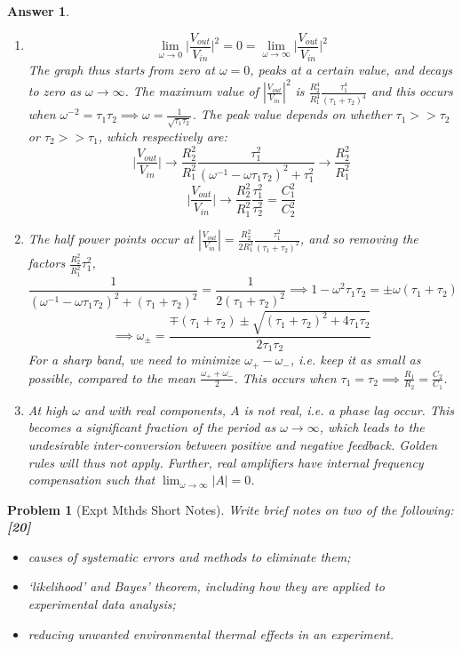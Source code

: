\documentclass[a4paper]{article}
\newtheorem{ans}{Answer}[subsection]
\theoremstyle{new}
\newtheorem{qns}{Problem}[subsection]
\begin{document}
\begin{ans}
\begin{enumerate}[label=(\roman*)]
\item 
$$\lim_{\omega\rightarrow 0}\bigg|\frac{V_{out}}{V_{in}}\bigg|^2=0=\lim_{\omega\rightarrow\infty}\bigg|\frac{V_{out}}{V_{in}}\bigg|^2$$
The graph thus starts from zero at $\omega=0$, peaks at a certain value, and decays to zero as $\omega\rightarrow\infty$. The maximum value of $|\frac{V_{out}}{V_{in}}|^2$ is $\frac{R_2^4}{R_1^4}\frac{\tau_1^4}{(\tau_1+\tau_2)^4}$ and this occurs when $\omega^{-2}=\tau_1\tau_2\implies\omega=\frac{1}{\sqrt{\tau_1\tau_2}}$. The peak value depends on whether $\tau_1>>\tau_2$ or $\tau_2>>\tau_1$, which respectively are: 
$$\bigg|\frac{V_{out}}{V_{in}}\bigg|\rightarrow\frac{R_2^2}{R_1^2}\frac{\tau_1^2}{(\omega^{-1}-\omega\tau_1\tau_2)^2+\tau_1^2}\rightarrow\frac{R_2^2}{R_1^2}$$
$$\bigg|\frac{V_{out}}{V_{in}}\bigg|\rightarrow\frac{R_2^2}{R_1^2}\frac{\tau_1^2}{\tau_2^2}=\frac{C_1^2}{C_2^2}$$
\item The half power points occur at $|\frac{V_{out}}{V_{in}}|=\frac{R_2^2}{2R_1^2}\frac{\tau_1^2}{(\tau_1+\tau_2)^2}$, and so removing the factors $\frac{R_2^2}{R_1^2}\tau_1^2$,
$$\frac{1}{(\omega^{-1}-\omega\tau_1\tau_2)^2+(\tau_1+\tau_2)^2}=\frac{1}{2(\tau_1+\tau_2)^2}\implies1-\omega^2\tau_1\tau_2=\pm\omega(\tau_1+\tau_2)$$
$$\implies \omega_\pm=\frac{\mp(\tau_1+\tau_2)\pm\sqrt{(\tau_1+\tau_2)^2+4\tau_1\tau_2}}{2\tau_1\tau_2}$$
For a sharp band, we need to minimize $\omega_+-\omega_-$, i.e. keep it as small as possible, compared to the mean $\frac{\omega_++\omega_-}{2}$. This occurs when $\tau_1=\tau_2\implies\frac{R_1}{R_2}=\frac{C_2}{C_1}$.
\item At high $\omega$ and with real components, $A$ is not real, i.e. a phase lag occur. This becomes a significant fraction of the period as $\omega\rightarrow\infty$, which leads to the undesirable inter-conversion between positive and negative feedback. Golden rules will thus not apply. Further, real amplifiers have internal frequency compensation such that $\lim_{\omega\rightarrow\infty}|A|=0$.
\end{enumerate}
\end{ans}
\newpage
\begin{qns}[Expt Mthds Short Notes]
Write brief notes on two of the following:\hfill\textbf{[20]}
\begin{itemize}
    \item causes of systematic errors and methods to eliminate them;
    \item `likelihood' and Bayes' theorem, including how they are applied to experimental data analysis;
    \item reducing unwanted environmental thermal effects in an experiment.
\end{itemize}
\end{qns}
\end{document}
